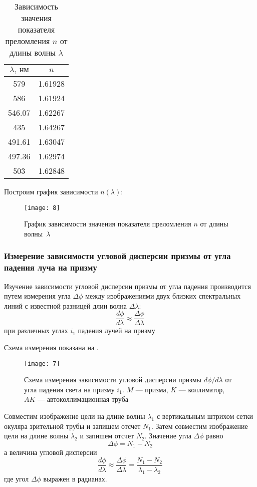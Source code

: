 \documentclass[a4paper, 12pt]{article}
\begin{document}
\renewcommand{\arraystretch}{1.2}
\begin{table}[H]
\centering
\begin{tabular}{|c|c|}
    \hline 
    $\lambda,\ \text{нм}$ & $n$ \\ \hline 
 579 & 1.61928 \\ \hline 
 586 & 1.61924 \\ \hline 
 546.07 & 1.62267 \\ \hline 
 435 & 1.64267 \\ \hline 
 491.61 & 1.63047 \\ \hline 
 497.36 & 1.62974 \\ \hline 
 503 & 1.62848 \\ \hline 
\end{tabular}
\caption{Зависимость значения показателя преломления $n$ от длины
волны $\lambda$}
\end{table}

Построим график зависимости $n(\lambda)$:

\begin{figure}[H]
    \texttt{[image: 8]} 
    \caption{График зависимости значения показателя преломления $n$ от длины
волны~$\lambda$}  
\label{fig:8}
\end{figure}

\subsubsection*{Измерение зависимости угловой дисперсии призмы от угла
падения луча на призму}

Изучение зависимости угловой дисперсии призмы от угла падения
производится путем измерения угла $\Delta \phi$ между изображениями
двух близких спектральных линий с известной разницей длин волна
$\Delta \lambda$:
\[
    \frac{d\phi}{d\lambda} \approx \frac{\Delta \phi}{\Delta \lambda}
\]
при различных углах $i_1$ падения лучей на призму

Схема измерения показана на .


\begin{figure}[H]
    \texttt{[image: 7]} 
    \caption{Схема измерения зависимости угловой дисперсии призмы
    $d\phi/d\lambda$ от угла падения света на призму $i_1$. $M$ ---
призма, $K$ --- коллиматор, $AK$ --- автоколлимационная труба}
\label{fig:7}
\end{figure}

Совместим изображение цели на длине волны $\lambda_1$ с вертикальным
штрихом сетки окуляра зрительной трубы и запишем отсчет $N_1$. Затем
совместим изображение цели на длине волны $\lambda_2$ и запишем отсчет
$N_2$. Значение угла $\Delta \phi$ равно
\[
    \Delta \phi = N_1-N_2
\]
а величина угловой дисперсии 
\[
    \frac{d\phi}{d\lambda} \approx \frac{\Delta \phi}{\Delta \lambda}
    = \frac{N_1 - N_2}{\lambda_1 - \lambda_2}
\]
где угол $\Delta \phi$ выражен в радианах.
\end{document}
